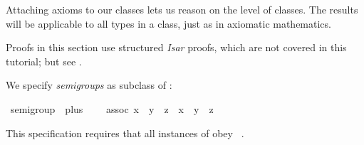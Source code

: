 %
\begin{isabellebody}%
\def\isabellecontext{Axioms}%
%
\isadelimtheory
%
\endisadelimtheory
%
\isatagtheory
%
\endisatagtheory
{\isafoldtheory}%
%
\isadelimtheory
%
\endisadelimtheory
%
\isamarkuptrue%
%
\begin{isamarkuptext}%
Attaching axioms to our classes lets us reason on the level of
classes.  The results will be applicable to all types in a class, just
as in axiomatic mathematics.

\begin{warn}
Proofs in this section use structured \emph{Isar} proofs, which are not
covered in this tutorial; but see \cite{Nipkow-TYPES02}.%
\end{warn}%
\end{isamarkuptext}%
\isamarkuptrue%
%
\isamarkuptrue%
%
\begin{isamarkuptext}%
We specify \emph{semigroups} as subclass of :%
\end{isamarkuptext}%
\isamarkuptrue%
\isamarkupfalse%
\ semigroup\ {}\ plus\ {}\isanewline
\ \ \ assoc{}\ {}{}x\ {}\ y{}\ {}\ z\ {}\ x\ {}\ {}y\ {}\ z{}{}%
\begin{isamarkuptext}%
\noindent This \hyperlink{command.class}{\mbox{}} specification requires that
all instances of  obey \hyperlink{fact.assoc:}{\mbox{}}~.


\end{isamarkuptext}
\end{isabellebody}
